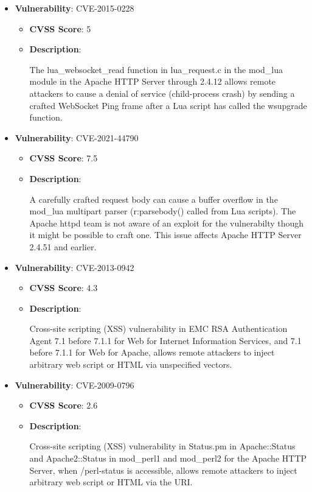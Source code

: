 \documentclass{article}
\begin{document}
\begin{itemize}
        \item \textbf{Vulnerability}: CVE-2015-0228
        \begin{itemize}
            \item \textbf{CVSS Score}:  5 
            \item \textbf{Description}:
            \parbox[t]{0.9\linewidth}{
                \ttfamily The lua\_websocket\_read function in lua\_request.c in the mod\_lua module in the Apache HTTP Server through 2.4.12 allows remote attackers to cause a denial of service (child-process crash) by sending a crafted WebSocket Ping frame after a Lua script has called the wsupgrade function.
            }
        \end{itemize}
    
        \item \textbf{Vulnerability}: CVE-2021-44790
        \begin{itemize}
            \item \textbf{CVSS Score}:  7.5 
            \item \textbf{Description}:
            \parbox[t]{0.9\linewidth}{
                \ttfamily A carefully crafted request body can cause a buffer overflow in the mod\_lua multipart parser (r:parsebody() called from Lua scripts). The Apache httpd team is not aware of an exploit for the vulnerabilty though it might be possible to craft one. This issue affects Apache HTTP Server 2.4.51 and earlier.
            }
        \end{itemize}
    
        \item \textbf{Vulnerability}: CVE-2013-0942
        \begin{itemize}
            \item \textbf{CVSS Score}:  4.3 
            \item \textbf{Description}:
            \parbox[t]{0.9\linewidth}{
                \ttfamily Cross-site scripting (XSS) vulnerability in EMC RSA Authentication Agent 7.1 before 7.1.1 for Web for Internet Information Services, and 7.1 before 7.1.1 for Web for Apache, allows remote attackers to inject arbitrary web script or HTML via unspecified vectors.
            }
        \end{itemize}
    
        \item \textbf{Vulnerability}: CVE-2009-0796
        \begin{itemize}
            \item \textbf{CVSS Score}:  2.6 
            \item \textbf{Description}:
            \parbox[t]{0.9\linewidth}{
                \ttfamily Cross-site scripting (XSS) vulnerability in Status.pm in Apache::Status and Apache2::Status in mod\_perl1 and mod\_perl2 for the Apache HTTP Server, when /perl-status is accessible, allows remote attackers to inject arbitrary web script or HTML via the URI.
            }
        \end{itemize}
    

\end{itemize}
\end{document}
